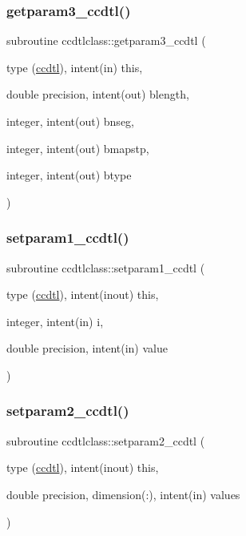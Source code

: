 \mbox{\label{namespaceccdtlclass_a529631343d4306c6c486d72e2a6696a3}} 
\subsubsection{\texorpdfstring{getparam3\_ccdtl()}{getparam3\_ccdtl()}}
{\footnotesize\ttfamily subroutine ccdtlclass\+::getparam3\+\_\+ccdtl (\begin{DoxyParamCaption}\item[{type (\mbox{\hyperlink{namespaceccdtlclass_structccdtlclass_1_1ccdtl}{ccdtl}}), intent(in)}]{this,  }\item[{double precision, intent(out)}]{blength,  }\item[{integer, intent(out)}]{bnseg,  }\item[{integer, intent(out)}]{bmapstp,  }\item[{integer, intent(out)}]{btype }\end{DoxyParamCaption})}

\mbox{\label{namespaceccdtlclass_adedaabef796136ab3b22dcc923243cfd}} 
\subsubsection{\texorpdfstring{setparam1\_ccdtl()}{setparam1\_ccdtl()}}
{\footnotesize\ttfamily subroutine ccdtlclass\+::setparam1\+\_\+ccdtl (\begin{DoxyParamCaption}\item[{type (\mbox{\hyperlink{namespaceccdtlclass_structccdtlclass_1_1ccdtl}{ccdtl}}), intent(inout)}]{this,  }\item[{integer, intent(in)}]{i,  }\item[{double precision, intent(in)}]{value }\end{DoxyParamCaption})}

\mbox{\label{namespaceccdtlclass_aa32b5665906eac3911db6712a5710f97}} 
\subsubsection{\texorpdfstring{setparam2\_ccdtl()}{setparam2\_ccdtl()}}
{\footnotesize\ttfamily subroutine ccdtlclass\+::setparam2\+\_\+ccdtl (\begin{DoxyParamCaption}\item[{type (\mbox{\hyperlink{namespaceccdtlclass_structccdtlclass_1_1ccdtl}{ccdtl}}), intent(inout)}]{this,  }\item[{double precision, dimension(\+:), intent(in)}]{values }\end{DoxyParamCaption})}

